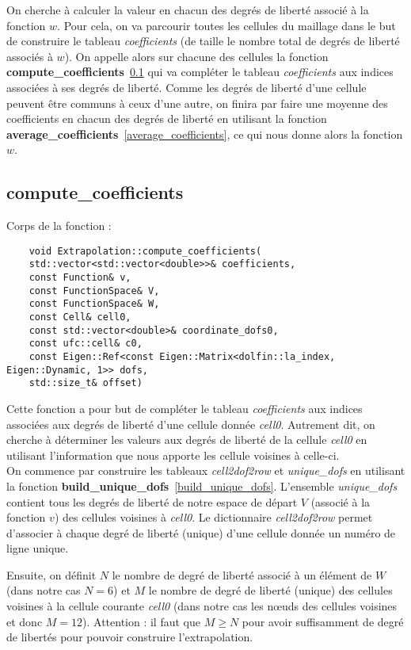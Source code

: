 On cherche à calculer la valeur en chacun des degrés de liberté associé à la fonction $w$. Pour cela, on va parcourir toutes les cellules du maillage dans le but de construire le tableau \textit{coefficients} (de taille le nombre total de degrés de liberté associés à $w$). On appelle alors sur chacune des cellules la fonction \textbf{compute\_coefficients}~\ref{compute_coefficients} qui va compléter le tableau \textit{coefficients} aux indices associées à ses degrés de liberté. Comme les degrés de liberté d'une cellule peuvent être communs à ceux d'une autre, on finira par faire une moyenne des coefficients en chacun des degrés de liberté en utilisant la fonction \textbf{average\_coefficients}~\ref{average_coefficients}, ce qui nous donne alors la fonction $w$. 

\subsection{compute\_coefficients}
\label{compute_coefficients}

Corps de la fonction :

\begin{lstlisting}
	void Extrapolation::compute_coefficients(
	std::vector<std::vector<double>>& coefficients,
	const Function& v,
	const FunctionSpace& V,
	const FunctionSpace& W,
	const Cell& cell0,
	const std::vector<double>& coordinate_dofs0,
	const ufc::cell& c0,
	const Eigen::Ref<const Eigen::Matrix<dolfin::la_index, Eigen::Dynamic, 1>> dofs,
	std::size_t& offset)
\end{lstlisting}

Cette fonction a pour but de compléter le tableau \textit{coefficients} aux indices associées aux degrés de liberté d'une cellule donnée \textit{cell0}. Autrement dit, on cherche à déterminer les valeurs aux degrés de liberté de la cellule \textit{cell0} en utilisant l'information que nous apporte les cellule voisines à celle-ci.\\

On commence par construire les tableaux \textit{cell2dof2row} et \textit{unique\_dofs} en utilisant la fonction \textbf{build\_unique\_dofs}~\ref{build_unique_dofs}. L'ensemble \textit{unique\_dofs} contient tous les degrés de liberté de notre espace de départ $V$ (associé à la fonction $v$) des cellules voisines à \textit{cell0}. Le dictionnaire \textit{cell2dof2row} permet d'associer à chaque degré de liberté (unique) d'une cellule donnée un numéro de ligne unique. 

Ensuite, on définit $N$ le nombre de degré de liberté associé à un élément de $W$ (dans notre cas $N=6$) et $M$ le nombre de degré de liberté (unique) des cellules voisines à la cellule courante \textit{cell0} (dans notre cas les nœuds des cellules voisines et donc $M=12$). Attention : il faut que $M\ge N$ pour avoir suffisamment de degré de libertés pour pouvoir construire l'extrapolation.

